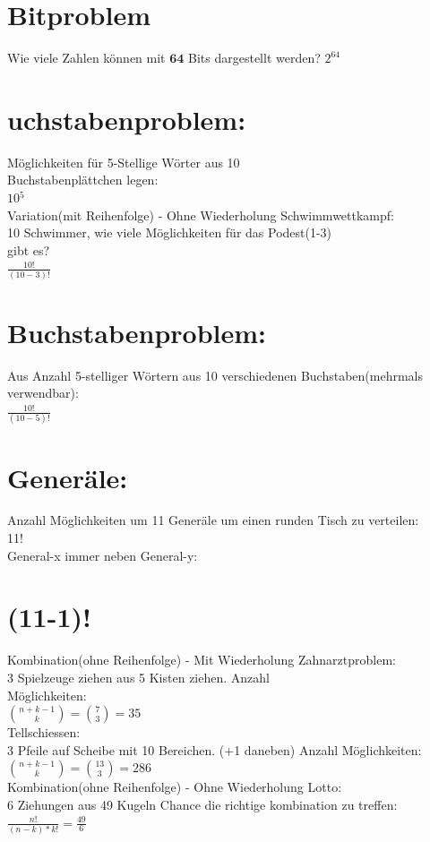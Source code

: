 \documentclass[10pt]{article}
\begin{document}
\section*{Bitproblem}
Wie viele Zahlen können mit $\mathbf{6 4}$ Bits dargestellt werden? $2^{64}$

\section*{uchstabenproblem:}
Möglichkeiten für 5-Stellige Wörter aus 10\\
Buchstabenplättchen legen:\\
$10{ }^{5}$\\
Variation(mit Reihenfolge) - Ohne Wiederholung Schwimmwettkampf:\\
10 Schwimmer, wie viele Möglichkeiten für das Podest(1-3)\\
gibt es?\\
$\frac{10!}{(10-3)!}$

\section*{Buchstabenproblem:}
Aus Anzahl 5-stelliger Wörtern aus 10 verschiedenen Buchstaben(mehrmals verwendbar):\\
$\frac{10!}{(10-5)!}$

\section*{Generäle:}
Anzahl Möglichkeiten um 11 Generäle um einen runden Tisch zu verteilen:\\
11!\\
General-x immer neben General-y:

\section*{(11-1)!}
Kombination(ohne Reihenfolge) - Mit Wiederholung Zahnarztproblem:\\
3 Spielzeuge ziehen aus 5 Kisten ziehen. Anzahl\\
Möglichkeiten:\\
$\binom{n+k-1}{k}=\binom{7}{3}=35$\\
Tellschiessen:\\
3 Pfeile auf Scheibe mit 10 Bereichen. (+1 daneben) Anzahl Möglichkeiten:\\
$\binom{n+k-1}{k}=\binom{13}{3}=286$\\
Kombination(ohne Reihenfolge) - Ohne Wiederholung Lotto:\\
6 Ziehungen aus 49 Kugeln Chance die richtige kombination zu treffen:\\
$\frac{n!}{(n-k) * k!}=\frac{49}{6}$
\end{document}
